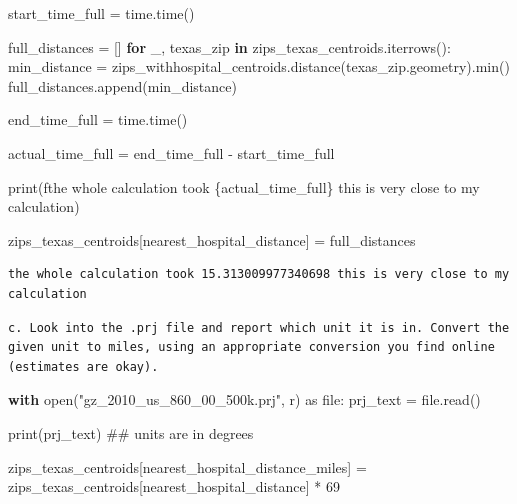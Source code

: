 \documentclass[
  letterpaper,
  DIV=11,
  numbers=noendperiod]{scrartcl}
\newenvironment{Shaded}{\begin{snugshade}}{\end{snugshade}}
\newcommand{\BuiltInTok}[1]{\textcolor[rgb]{0.00,0.23,0.31}{#1}}
\newcommand{\CommentTok}[1]{\textcolor[rgb]{0.37,0.37,0.37}{#1}}
\newcommand{\ControlFlowTok}[1]{\textcolor[rgb]{0.00,0.23,0.31}{\textbf{#1}}}
\newcommand{\DecValTok}[1]{\textcolor[rgb]{0.68,0.00,0.00}{#1}}
\newcommand{\ImportTok}[1]{\textcolor[rgb]{0.00,0.46,0.62}{#1}}
\newcommand{\KeywordTok}[1]{\textcolor[rgb]{0.00,0.23,0.31}{\textbf{#1}}}
\newcommand{\NormalTok}[1]{\textcolor[rgb]{0.00,0.23,0.31}{#1}}
\newcommand{\OperatorTok}[1]{\textcolor[rgb]{0.37,0.37,0.37}{#1}}
\newcommand{\SpecialCharTok}[1]{\textcolor[rgb]{0.37,0.37,0.37}{#1}}
\newcommand{\SpecialStringTok}[1]{\textcolor[rgb]{0.13,0.47,0.30}{#1}}
\newcommand{\StringTok}[1]{\textcolor[rgb]{0.13,0.47,0.30}{#1}}
\begin{document}
\begin{Shaded}
\begin{Highlighting}[]
\NormalTok{start\_time\_full }\OperatorTok{=}\NormalTok{ time.time()}

\NormalTok{full\_distances }\OperatorTok{=}\NormalTok{ []}
\ControlFlowTok{for}\NormalTok{ \_, texas\_zip }\KeywordTok{in}\NormalTok{ zips\_texas\_centroids.iterrows():}
\NormalTok{    min\_distance }\OperatorTok{=}\NormalTok{ zips\_withhospital\_centroids.distance(texas\_zip.geometry).}\BuiltInTok{min}\NormalTok{()}
\NormalTok{    full\_distances.append(min\_distance)}


\NormalTok{end\_time\_full }\OperatorTok{=}\NormalTok{ time.time()}

\NormalTok{actual\_time\_full }\OperatorTok{=}\NormalTok{ end\_time\_full }\OperatorTok{{-}}\NormalTok{ start\_time\_full}

\BuiltInTok{print}\NormalTok{(}\SpecialStringTok{f\textquotesingle{}the whole calculation took }\SpecialCharTok{\{}\NormalTok{actual\_time\_full}\SpecialCharTok{\}}\SpecialStringTok{ this is very close to my calculation\textquotesingle{}}\NormalTok{)}

\NormalTok{zips\_texas\_centroids[}\StringTok{\textquotesingle{}nearest\_hospital\_distance\textquotesingle{}}\NormalTok{] }\OperatorTok{=}\NormalTok{ full\_distances}
\end{Highlighting}
\end{Shaded}

\begin{verbatim}
the whole calculation took 15.313009977340698 this is very close to my calculation
\end{verbatim}

\begin{verbatim}
c. Look into the .prj file and report which unit it is in. Convert the given unit to miles, using an appropriate conversion you find online (estimates are okay).
\end{verbatim}

\begin{Shaded}
\begin{Highlighting}[]
\ControlFlowTok{with} \BuiltInTok{open}\NormalTok{(}\StringTok{"gz\_2010\_us\_860\_00\_500k.prj"}\NormalTok{, }\StringTok{\textquotesingle{}r\textquotesingle{}}\NormalTok{) }\ImportTok{as} \BuiltInTok{file}\NormalTok{:}
\NormalTok{    prj\_text }\OperatorTok{=} \BuiltInTok{file}\NormalTok{.read()}

\BuiltInTok{print}\NormalTok{(prj\_text) }\CommentTok{\#\# units are in degrees}

\NormalTok{zips\_texas\_centroids[}\StringTok{\textquotesingle{}nearest\_hospital\_distance\_miles\textquotesingle{}}\NormalTok{] }\OperatorTok{=}\NormalTok{ zips\_texas\_centroids[}\StringTok{\textquotesingle{}nearest\_hospital\_distance\textquotesingle{}}\NormalTok{] }\OperatorTok{*} \DecValTok{69}
\end{Highlighting}
\end{Shaded}
\end{document}
